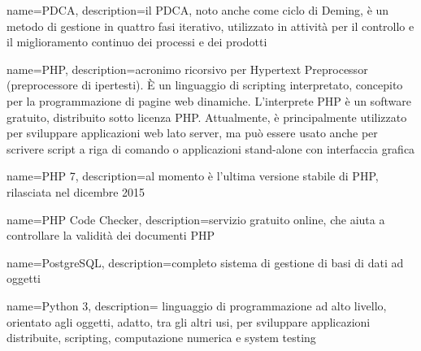 


{
	name=PDCA,
	description={il PDCA, noto anche come ciclo di Deming, è un metodo di gestione in quattro fasi iterativo, utilizzato in attività per il controllo e il miglioramento continuo dei processi e dei prodotti}
}

{
	name=PHP,
	description={acronimo ricorsivo per Hypertext Preprocessor (preprocessore di ipertesti). \MakeUppercase{è} un linguaggio di scripting interpretato, concepito per la programmazione di pagine web dinamiche. L'interprete PHP è un software gratuito, distribuito sotto licenza PHP. Attualmente, è principalmente utilizzato per sviluppare applicazioni web lato server, ma può essere usato anche per scrivere script a riga di comando o applicazioni stand-alone con interfaccia grafica}
}

{
	name=PHP 7,
	description={al momento è l'ultima versione stabile di PHP, rilasciata nel dicembre 2015}
}

{
	name=PHP Code Checker,
	description={servizio gratuito online, che aiuta a controllare la validità dei documenti PHP}
}

{
	name=PostgreSQL,
	description={completo sistema di gestione di basi di dati ad oggetti}
}

{
	name=Python 3,
	description={ linguaggio di programmazione ad alto livello, orientato agli oggetti, adatto, tra gli altri usi, per sviluppare applicazioni distribuite, scripting, computazione numerica e system testing}
}

